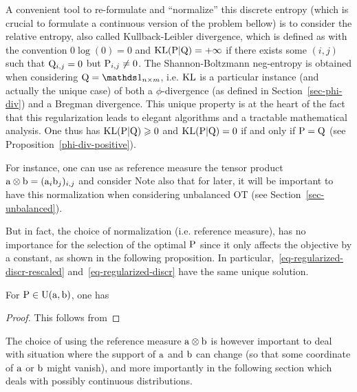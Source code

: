 A convenient tool to re-formulate and ``normalize'' this discrete entropy (which is crucial to formulate a continuous version of the problem bellow) is to consider the relative entropy, also called  Kullback-Leibler divergence, which is defined as
with the convention $0\log(0)=0$ and $\KLD(\P|\Q)=+\infty$ if there exists some $(i,j)$ such that $\Q_{i,j}=0$ but $\P_{i,j} \neq 0$. 
%
The Shannon-Boltzmann neg-entropy is obtained when considering $\Q=\ones_{n \times m}$, i.e.  
$\KLD$ is a particular instance (and actually the unique case) of both a $\phi$-divergence (as defined in Section~\ref{sec-phi-div}) and a Bregman divergence. This unique property is at the heart of the fact that this regularization leads to elegant algorithms and a tractable mathematical analysis. One thus has $\KLD(\P|\Q) \geq 0$ and  $\KLD(\P|\Q)=0$ if and only if $\P=\Q$ (see Proposition~\ref{phi-div-positive}).

For instance, one can use as reference measure the tensor product $\a \otimes \b = (\a_i \b_j)_{i,j}$ and consider 
Note also that for later, it will be important to have this normalization when considering unbalanced OT (see Section~\ref{sec-unbalanced}).

But in fact, the choice of normalization (i.e. reference measure), has no importance for the selection of the optimal $\P$ since it only affects the objective by a constant, as shown in the following proposition.
%
In particular,~\eqref{eq-regularized-discr-rescaled} and~\eqref{eq-regularized-discr} have the same unique solution.


\begin{prop} \label{prop-kl-shift} For $\P \in \CouplingsD(\a,\b)$, one has
\end{prop}

\begin{proof}
This follows from 
\end{proof}

The choice of using the reference measure $\a \otimes \b$ is however important to deal with situation where the support of $\a$ and $\b$ can change (so that some coordinate of $\a$ or $\b$ might vanish), and more importantly in the following section which deals with possibly continuous distributions. %

